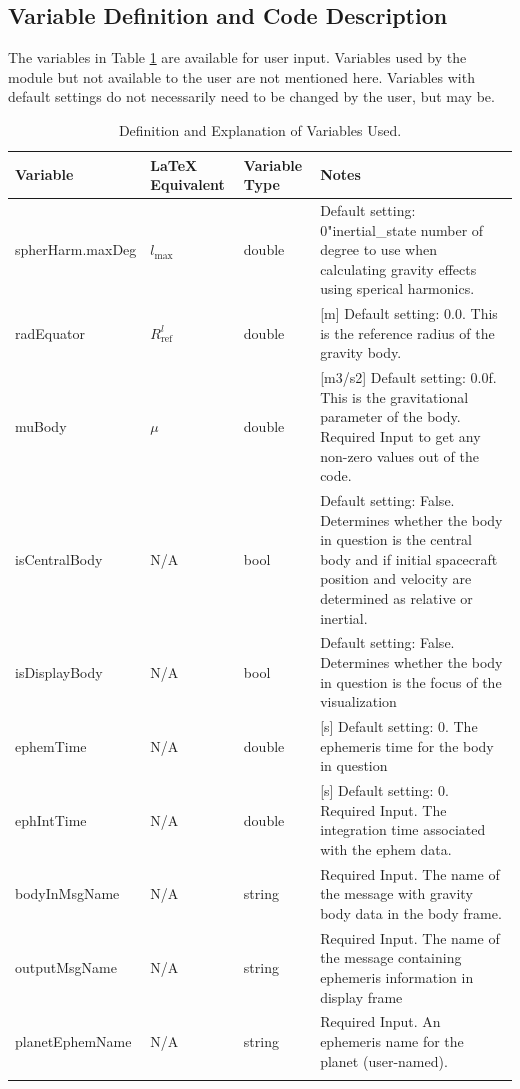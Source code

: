 \subsection{Variable Definition and Code Description}
The variables in Table \ref{tabular:vars} are available for user input. Variables used by the module but not available to the user are not mentioned here. Variables with default settings do not necessarily need to be changed by the user, but may be.
\begin{table}[H]
	\caption{Definition and Explanation of Variables Used.}
	\label{tab:errortol}
	\centering \fontsize{10}{10}\selectfont
	\begin{tabular}{ | m{3cm}| m{3cm} | m{3cm} | m{6cm} |} %
		\hline
		\textbf{Variable}   							& \textbf{LaTeX Equivalent} 	&		\textbf{Variable Type} & \textbf{Notes}			  \\ \hline
		spherHarm.maxDeg					&$l_{\text{max}}$		 	  & double & Default setting: 0"inertial\_state number of degree to use when calculating gravity effects using sperical harmonics.\\ \hline
		radEquator			   & $R_{\mathrm{ref}}^{l}$			& double & [m] Default setting: 0.0. 	This is the reference radius of the gravity body.\\ \hline
		muBody					& $\mu$ 		& double & [m3/s2] Default setting: 0.0f. This is the gravitational parameter of the body. Required Input to get any non-zero values out of the code.\\ \hline
		isCentralBody & N/A & bool & Default setting: False. Determines whether the body in question is the central body and if initial spacecraft position and velocity are determined as relative or inertial.\\ \hline
		isDisplayBody & N/A & bool & Default setting: False. Determines whether the body in question is the focus of the visualization\\ \hline
		ephemTime & N/A & double & [s] Default setting: 0. The ephemeris time for the body in question \\ \hline
		ephIntTime & N/A & double & [s] Default setting: 0. Required Input. The integration time associated with the ephem data. \\ \hline
		bodyInMsgName & N/A & string & Required Input. The name of the message with gravity body data in the body frame. \\ \hline
		outputMsgName & N/A & string & Required Input. The name of the message containing ephemeris information in display frame \\ \hline
		planetEphemName & N/A & string & Required Input. An ephemeris name for the planet (user-named). \\ \hline
		\label{tabular:vars}
	\end{tabular}
\end{table}

